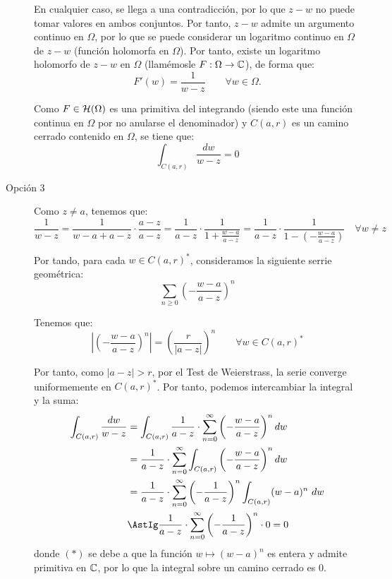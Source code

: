 \begin{ejercicio}
\begin{description}
        En cualquier caso, se llega a una contradicción, por lo que $z-w$ no puede tomar valores en ambos conjuntos. Por tanto, $z-w$ admite un argumento continuo en $\Omega$, por lo que se puede considerar un logaritmo continuo en $\Omega$ de $z-w$ (función holomorfa en $\Omega$). Por tanto, existe un logaritmo holomorfo de $z-w$ en $\Omega$ (llamémosle $F:\Omega \to \mathbb{C}$), de forma que:
        \begin{equation*}
            F'(w) = \frac{1}{w-z} \qquad \forall w \in \Omega.
        \end{equation*}

        Como $F\in \mathcal{H}(\Omega)$ es una primitiva del integrando (siendo este una función continua en $\Omega$ por no anularse el denominador) y $C(a,r)$ es un camino cerrado contenido en $\Omega$, se tiene que:
        \begin{equation*}
            \int_{C(a,r)} \frac{dw}{w-z} = 0
        \end{equation*}

        \item[Opción 3] Como $z\neq a$, tenemos que:
        \begin{equation*}
            \dfrac{1}{w-z} = \dfrac{1}{w-a+a-z}\cdot \dfrac{a-z}{a-z}
            = \dfrac{1}{a-z}\cdot \dfrac{1}{1+\frac{w-a}{a-z}}
            = \dfrac{1}{a-z}\cdot \dfrac{1}{1-\left(-\frac{w-a}{a-z}\right)}\quad \forall w\neq z
        \end{equation*}

        Por tando, para cada $w\in C(a,r)^*$, consideramos la siguiente serrie geométrica:
        \begin{equation*}
            \sum_{n\geq 0} \left(-\frac{w-a}{a-z}\right)^n
        \end{equation*}

        Tenemos que:
        \begin{equation*}
            \left|\left(-\frac{w-a}{a-z}\right)^n\right| = \left(\frac{r}{|a-z|}\right)^n\qquad \forall w\in C(a,r)^*
        \end{equation*}

        Por tanto, como $|a-z|>r$, por el Test de Weierstrass, la serie converge uniformemente en $C(a,r)^*$. Por tanto, podemos intercambiar la integral y la suma:
        \begin{align*}
            \int_{C(a,r)} \frac{dw}{w-z} &= \int_{C(a,r)} \frac{1}{a-z}\cdot \sum_{n=0}^\infty \left(-\frac{w-a}{a-z}\right)^n dw\\
            &= \frac{1}{a-z}\cdot \sum_{n=0}^\infty \int_{C(a,r)} \left(-\frac{w-a}{a-z}\right)^n dw\\
            &= \frac{1}{a-z}\cdot \sum_{n=0}^\infty \left(-\frac{1}{a-z}\right)^n \int_{C(a,r)} (w-a)^n \ dw\\
            &\AstIg \frac{1}{a-z}\cdot \sum_{n=0}^\infty \left(-\frac{1}{a-z}\right)^n \cdot 0= 0
        \end{align*}
        donde $(\ast)$ se debe a que la función $w\mapsto (w-a)^n$ es entera y admite primitiva en $\mathbb{C}$, por lo que la integral sobre un camino cerrado es $0$.


\end{description}
\end{ejercicio}
